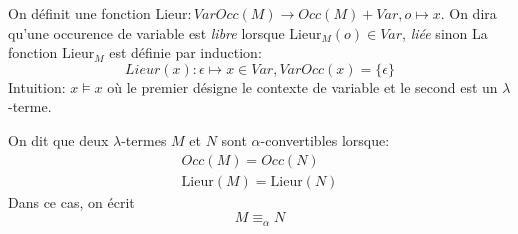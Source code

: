 \documentclass[math, info]{cours}
\begin{document}
\begin{definition}
	On définit une fonction $\mathrm{Lieur} : VarOcc\left(M\right) \to Occ(M) + Var, o\mapsto x$.
	On dira qu'une occurence de variable est \emph{libre} lorsque $\mathrm{Lieur}_{M}(o) \in Var$, \emph{liée} sinon
	La fonction $\mathrm{Lieur}_{M}$ est définie par induction:
	\begin{equation*}
		Lieur(x): \epsilon \mapsto x \in Var, VarOcc(x) = \{\epsilon\}
	\end{equation*}
	Intuition: $x \models x$ où le premier désigne le contexte de variable et le second est un $\lambda$-terme.
	\begin{center}
		\begin{mgrammar}
		\end{mgrammar}
	\end{center}
\end{definition}

\begin{definition}
	On dit que deux $\lambda$-termes $M$ et $N$ sont $\alpha$-convertibles lorsque:
	\begin{align*}
		Occ(M) = Occ(N) \\
		\mathrm{Lieur}(M) = \mathrm{Lieur}(N)
	\end{align*}
	Dans ce cas, on écrit
	\begin{equation*}
		M \equiv_{\alpha} N
	\end{equation*}
	\label{def:alphaconversion}
\end{definition}
\end{document}
